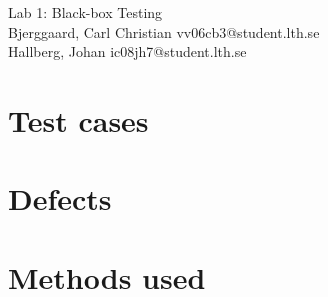 \documentclass[titlepage]{article}
\begin{document}
\begin{center}
	\huge{Lab 1: Black-box Testing } \\
	\small{Bjerggaard, Carl Christian vv06cb3@student.lth.se \\Hallberg, Johan ic08jh7@student.lth.se}

\vspace*{1cm}

\end{center}

\thispagestyle{empty}

\clearpage
\section{Test cases}

\clearpage
\section{Defects}

\clearpage
\section{Methods used}

\end{document}
